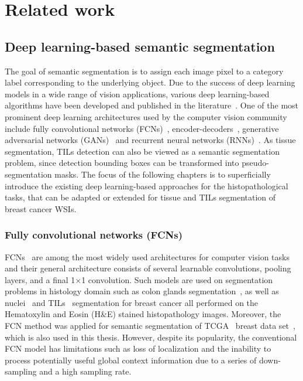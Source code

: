 \chapter{Related work}

\section{Deep learning-based semantic segmentation}
The goal of semantic segmentation is to assign each image pixel
to a category label corresponding to the underlying object.
Due to the success of deep learning models in a wide range of vision applications,
various deep learning-based algorithms have been developed and
published in the literature~\cite{minaee2021image}.
One of the most prominent deep learning architectures used by the computer vision
community include fully convolutional networks (FCNs)~\cite{long2015fully},
encoder-decoders~\cite{noh2015learning}, generative adversarial networks
(GANs)~\cite{goodfellow2014generative} and recurrent neural networks (RNNs)~\cite{rumelhart1986learning}.
As tissue segmentation, TILs detection can also be viewed as a semantic segmentation problem, since detection bounding boxes can be transformed
into pseudo-segmentation masks. The focus of the following chapters is to superficially introduce
the existing deep learning-based approaches for the histopathological tasks, that can be adapted or
extended for tissue and TILs segmentation of breast cancer WSIs.


\subsection{Fully convolutional networks (FCNs)}
FCNs~\cite{long2015fully} are among the most widely used architectures for computer vision
tasks and their general architecture consists of several learnable convolutions, pooling layers,
and a final 1$\times$1 convolution. Such models are used on segmentation problems
in histology domain such as colon glands segmentation~\cite{bentaieb2016topology},
as well as nuclei~\cite{natarajan2020segmentation} and TILs~\cite{amgad2019joint} segmentation for
breast cancer all performed on the Hematoxylin and Eosin (H\&E) stained histopathology images.
Moreover, the FCN method was applied for semantic segmentation of TCGA~\cite{gutman2013cancer}
breast data set~\cite{amgad2019structured}, which is also used in this thesis. However,
despite its popularity, the conventional FCN model has limitations such as loss of localization
and the inability to process potentially useful global context information due to a series of
down-sampling and a high sampling rate.


